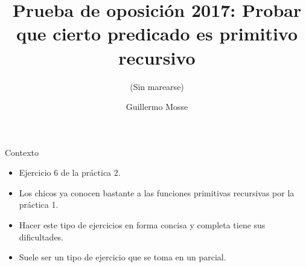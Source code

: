 \documentclass[10pt]{beamer}
\begin{document}


\title{Prueba de oposición 2017: Probar que cierto predicado es primitivo recursivo}
\subtitle{\small{(Sin marearse)}}
\date{}
\author{Guillermo Mosse}

\maketitle


\begin{frame}{Contexto}
\begin{itemize}

	

	\item Ejercicio 6 de la práctica 2.
	\item Los chicos ya conocen bastante a las funciones primitivas recursivas por la práctica 1.
	\item Hacer este tipo de ejercicios en forma concisa y completa tiene sus dificultades.
	\item Suele ser un tipo de ejercicio que se toma en un parcial.
\end{itemize}
\end{frame}    
\end{document}
